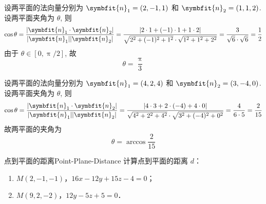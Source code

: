 \begin{solution}
    设两平面的法向量分别为 $\symbfit{n}_1 = (2, -1, 1)$ 和 $\symbfit{n}_2 = (1, 1, 2)$. 设两平面夹角为 $\theta$, 则
    \begin{equation}
        \cos \theta = \frac{|\symbfit{n}_1 \cdot \symbfit{n}_2|}{|\symbfit{n}_1||\symbfit{n}_2|} = \frac{|2 \cdot 1 + (-1) \cdot 1 + 1 \cdot 2|}{\sqrt{2^2 + (-1)^2 + 1^2} \cdot \sqrt{1^2 + 1^2 + 2^2}} = \frac{3}{\sqrt{6} \cdot \sqrt{6}} = \frac{1}{2}
    \end{equation}
    由于 $\theta \in [0, \uppi/2]$, 故
    \begin{equation}
        \boxed{\theta = \frac{\uppi}{3}}
    \end{equation}

    设两平面的法向量分别为 $\symbfit{n}_1 = (4, 2, 4)$ 和 $\symbfit{n}_2 = (3, -4, 0)$. 设两平面夹角为 $\theta$, 则
    \begin{equation}
        \cos \theta = \frac{|\symbfit{n}_1 \cdot \symbfit{n}_2|}{|\symbfit{n}_1||\symbfit{n}_2|} = \frac{|4 \cdot 3 + 2 \cdot (-4) + 4 \cdot 0|}{\sqrt{4^2 + 2^2 + 4^2} \cdot \sqrt{3^2 + (-4)^2 + 0^2}} = \frac{4}{6 \cdot 5} = \frac{2}{15}
    \end{equation}
    故两平面的夹角为
    \begin{equation}
        \boxed{\theta = \arccos \frac{2}{15}}
    \end{equation}
\end{solution}


\begin{problem}{点到平面的距离}{Point-Plane-Distance}
    计算点到平面的距离 $d$：
    \begin{enumerate}
        \item $M(2, -1, -1)$，$16x - 12y + 15z - 4 = 0$；
        \item $M(9, 2, -2)$，$12y - 5z + 5 = 0$．
    \end{enumerate}
\end{problem}

